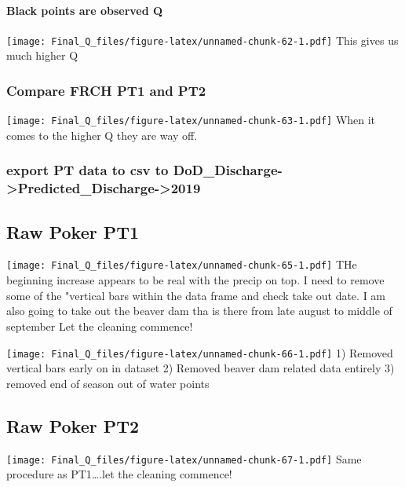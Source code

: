 \documentclass[
]{article}
\begin{document}
\hypertarget{black-points-are-observed-q-6}{%
\paragraph{Black points are observed
Q}\label{black-points-are-observed-q-6}}

\texttt{[image: Final\_Q\_files/figure-latex/unnamed-chunk-62-1.pdf]} This
gives us much higher Q

\hypertarget{compare-frch-pt1-and-pt2}{%
\subsubsection{Compare FRCH PT1 and
PT2}\label{compare-frch-pt1-and-pt2}}

\texttt{[image: Final\_Q\_files/figure-latex/unnamed-chunk-63-1.pdf]} When
it comes to the higher Q they are way off.

\hypertarget{export-pt-data-to-csv-to-dod_discharge-predicted_discharge-2019-1}{%
\subsubsection{export PT data to csv to
DoD\_Discharge-\textgreater Predicted\_Discharge-\textgreater2019}\label{export-pt-data-to-csv-to-dod_discharge-predicted_discharge-2019-1}}

\hypertarget{raw-poker-pt1}{%
\subsection{Raw Poker PT1}\label{raw-poker-pt1}}

\texttt{[image: Final\_Q\_files/figure-latex/unnamed-chunk-65-1.pdf]} THe
beginning increase appears to be real with the precip on top. I need to
remove some of the "vertical bars within the data frame and check take
out date. I am also going to take out the beaver dam tha is there from
late august to middle of september Let the cleaning commence!

\texttt{[image: Final\_Q\_files/figure-latex/unnamed-chunk-66-1.pdf]} 1)
Removed vertical bars early on in dataset 2) Removed beaver dam related
data entirely 3) removed end of season out of water points

\hypertarget{raw-poker-pt2}{%
\subsection{Raw Poker PT2}\label{raw-poker-pt2}}

\texttt{[image: Final\_Q\_files/figure-latex/unnamed-chunk-67-1.pdf]} Same
procedure as PT1\ldots.let the cleaning commence!
\end{document}
